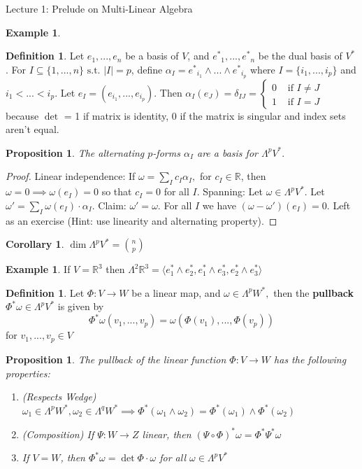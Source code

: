 \documentclass[10pt]{article}
\theoremstyle{plain}
\newtheorem{corollary}[thm]{Corollary}
\newtheorem{prop}[thm]{Proposition}
\theoremstyle{definition}
\newtheorem{defn}[thm]{Definition} %
\newtheorem{exmp}[thm]{Example} %
\newcommand{\st}{\text{ s.t. }}
\newcommand{\myif}{\text{ if }}
\newcommand{\Real}{\mathbb{R}}
\newcommand{\setform}[2]{\Lambda^{#1} {#2}}
\newcommand{\allthevs}[2]{v_{#1},...,v_{#2}}
\newcommand{\allthe}[3]{{#1}_{#2},...,{#1}_{#3}}
\newcommand{\wedgge}{\omega_1\wedge\omega_2}
\newcommand{\allthewedge}[3]{{#1}_{#2}\wedge...\wedge{#1}_{#3}}
\begin{document}
\begin{section}{Lecture 1: Prelude on Multi-Linear Algebra}
\begin{exmp}
\end{exmp}
\begin{defn}
Let $\allthe{e}{1}{n}$ be a basis of $V$, and $\allthe{e^*}{1}{n}$ be the dual basis of $V^*$. For $I \subseteq \{1,...,n\} \st \vert I \vert = p$, define $\alpha_I = \allthewedge{e^*}{i_1}{i_p}$ where $I = \{\allthe{i}{1}{p}\}$ and $i_1 < ... < i_p$. Let $e_I = (\allthe{e}{i_1}{i_p})$. Then $\alpha_I(e_J) = \delta_{IJ} = \begin{cases} 
    0 &\myif I \neq J \\
    1 &\myif  I = J
\end{cases} $   because $\det$ = 1 if matrix is identity, 0 if the matrix is singular and index sets aren't equal.
\end{defn}
\begin{prop}
The alternating $p$-forms $\alpha_I$ are a basis for $\setform{p}{V^*}.$
\end{prop}
\begin{proof}
Linear independence: If $ \omega = \sum\limits_{I} c_I \alpha_I,$ for $c_I \in \Real$, then $\omega = 0 \implies \omega(e_I) = 0$ so that $ c_I = 0$ for all $I$.
Spanning: Let $\omega \in \setform{p}{V^*}$. Let $\omega'= \sum\limits_{I} \omega(e_I)\cdot \alpha_I$. Claim: $\omega' = \omega$. For all $I$ we have $(\omega-\omega')(e_I) =0$. Left as an exercise (Hint: use linearity and alternating property).
\end{proof}
\begin{corollary}
$\dim \setform{p}{V^*} = {\binom{n}{p}}$
\end{corollary}
\begin{exmp}
If $V = \Real^3$ then $\setform{2}{\Real^3} = \langle e^*_1 \wedge e_2^*,e^*_1 \wedge e_3^*,e^*_2 \wedge e_3^*\rangle$
\end{exmp}
\begin{defn}
Let $\Phi : V \to W$ be a linear map, and $\omega \in \setform{p}{W^*},$ then the \textbf{pullback} $\Phi^*\omega \in \setform{p}{V^*}$ is given by
$$\Phi^* \omega(\allthevs{1}{p}) = \omega(\Phi(v_1),...,\Phi(v_p)) $$
for $\allthevs{1}{p} \in V$
\end{defn}
\begin{prop}
The pullback of the linear function $\Phi:V\to W$ has the following properties:
\begin{enumerate}
    \item (Respects Wedge) $\omega_1 \in\setform{p}{W^*}, \omega_2\in\setform{q}{W^*} \implies \Phi^*(\wedgge) = \Phi^*(\omega_1)\wedge \Phi^*(\omega_2)$
    \item (Composition) If $\Psi:W\to Z$ linear, then $(\Psi\circ\Phi)^*\omega = \Phi^*\Psi^*\omega$
    \item If $V = W$, then $\Phi^*\omega = \det\Phi\cdot\omega$ for all $\omega \in \setform{p}{V^*}$
\end{enumerate}
\end{prop}
\end{section}
\end{document}
